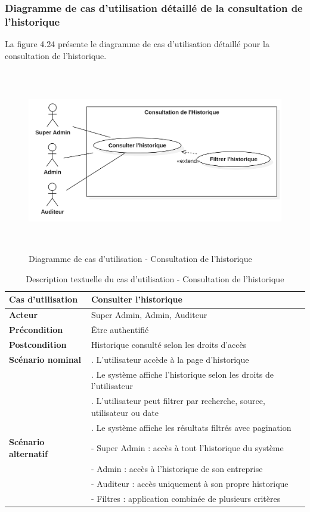 \subsubsection{Diagramme de cas d'utilisation détaillé de la consultation de l'historique}
\noindent La figure 4.24 présente le diagramme de cas d'utilisation détaillé pour la consultation de l'historique.

\begin{figure}[H]
    \centering
    \includegraphics[width=12cm,height=8cm]{images/historyuc.png}
    \caption{Diagramme de cas d'utilisation - Consultation de l'historique}
\end{figure}

\begin{longtable}{|>{\raggedright\arraybackslash}p{4cm}|>{\raggedright\arraybackslash}p{9cm}|}
\caption{Description textuelle du cas d'utilisation - Consultation de l'historique}
\label{tab:consult_history_usecase} \\
\hline
\textbf{Cas d'utilisation} & \textbf{Consulter l'historique} \\
\hline
\textbf{Acteur} & Super Admin, Admin, Auditeur \\
\hline
\textbf{Précondition} & Être authentifié \\
\hline
\textbf{Postcondition} & Historique consulté selon les droits d'accès \\
\hline
\textbf{Scénario nominal} & 
1. L'utilisateur accède à la page d'historique \\
& 2. Le système affiche l'historique selon les droits de l'utilisateur \\
& 3. L'utilisateur peut filtrer par recherche, source, utilisateur ou date \\
& 4. Le système affiche les résultats filtrés avec pagination \\
\hline
\textbf{Scénario alternatif} & 
- Super Admin : accès à tout l'historique du système \\
& - Admin : accès à l'historique de son entreprise \\
& - Auditeur : accès uniquement à son propre historique \\
& - Filtres : application combinée de plusieurs critères \\
\hline
\end{longtable}

